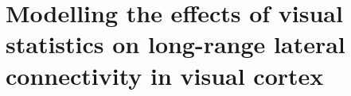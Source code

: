 \chapter{Modelling the effects of visual statistics on long-range lateral connectivity in visual cortex}

